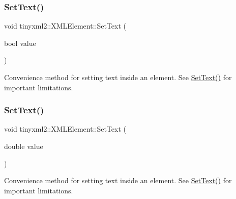 \mbox{\label{classtinyxml2_1_1_x_m_l_element_ae4b543d6770de76fb6ab68e541c192a4}} 
\subsubsection{\texorpdfstring{Set\+Text()}{SetText()}\hspace{0.1cm}{\footnotesize\ttfamily [5/7]}}
{\footnotesize\ttfamily void tinyxml2\+::\+X\+M\+L\+Element\+::\+Set\+Text (\begin{DoxyParamCaption}\item[{bool}]{value }\end{DoxyParamCaption})}



Convenience method for setting text inside an element. See \mbox{\hyperlink{classtinyxml2_1_1_x_m_l_element_a1f9c2cd61b72af5ae708d37b7ad283ce}{Set\+Text()}} for important limitations. 

\mbox{\label{classtinyxml2_1_1_x_m_l_element_a67bd77ac9aaeff58ff20b4275a65ba4e}} 
\subsubsection{\texorpdfstring{Set\+Text()}{SetText()}\hspace{0.1cm}{\footnotesize\ttfamily [6/7]}}
{\footnotesize\ttfamily void tinyxml2\+::\+X\+M\+L\+Element\+::\+Set\+Text (\begin{DoxyParamCaption}\item[{double}]{value }\end{DoxyParamCaption})}



Convenience method for setting text inside an element. See \mbox{\hyperlink{classtinyxml2_1_1_x_m_l_element_a1f9c2cd61b72af5ae708d37b7ad283ce}{Set\+Text()}} for important limitations. 

\mbox{\label{classtinyxml2_1_1_x_m_l_element_a51d560da5ae3ad6b75e0ab9ffb2ae42a}} 
